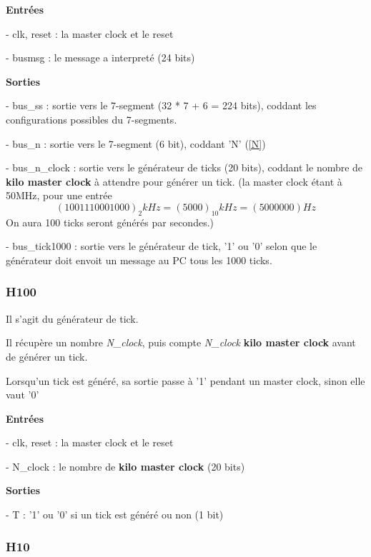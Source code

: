 \documentclass[10pt]{article}
\begin{document}
        \textbf{Entrées}
        
            - clk, reset : la master clock et le reset
            
            - busmsg : le message a interpreté (24 bits)
                            
        \textbf{Sorties}
            
            - bus\_ss : sortie vers le 7-segment (32 * 7 + 6 = 224 bits), coddant les configurations possibles du 7-segments.
           
            - bus\_n : sortie vers le 7-segment (6 bit), coddant 'N' (\ref{N})

            - bus\_n\_clock : sortie vers le générateur de ticks (20 bits), coddant le nombre de \textbf{kilo master clock} à attendre pour générer un tick. (la master clock étant à 50MHz, pour une entrée
            $$(1001110001000)_2 kHz = (5000)_{10} kHz = (5000000) Hz$$
            On aura 100 ticks seront générés par secondes.)
            
            - bus\_tick1000 : sortie vers le générateur de tick, '1' ou '0' selon que le générateur doit envoit un message au PC tous les 1000 ticks.

        
        \subsubsection{H100}
        
        Il s'agit du générateur de tick.
                
        Il récupère un nombre \textit{N\_clock}, puis compte \textit{N\_clock} \textbf{kilo master clock}
        avant de générer un tick.
        
        Lorsqu'un tick est généré, sa sortie passe à '1' pendant un master clock, sinon elle vaut '0'
        
        \textbf{Entrées}
        
            - clk, reset : la master clock et le reset
            
            - N\_clock : le nombre de \textbf{kilo master clock} (20 bits)
                            
        \textbf{Sorties}
            
            - T : '1' ou '0' si un tick est généré ou non (1 bit)
        
        \subsubsection{H10}
        
\end{document}
